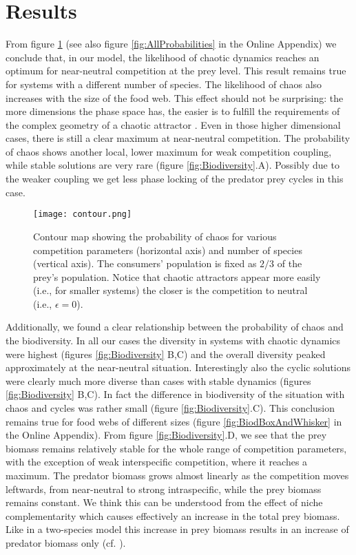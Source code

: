 \section{Results}
\label{sec:Results}
From figure \ref{fig:Contour} (see also figure \ref{fig:AllProbabilities} in the Online Appendix) we conclude that, in our model, the likelihood of chaotic dynamics reaches an optimum for near-neutral competition at the prey level. This result remains true for systems with a different number of species. The likelihood of chaos also increases with the size of the food web. This effect should not be surprising: the more dimensions the phase space has, the easier is to fulfill the requirements of the complex geometry of a chaotic attractor \citep{Strogatz1994}. Even in those higher dimensional cases, there is still a clear maximum at near-neutral competition. The probability of chaos shows another local, lower maximum for weak competition coupling, while stable solutions are very rare (figure \ref{fig:Biodiversity}.A). Possibly due to the weaker coupling we get less phase locking of the predator prey cycles in this case.

\begin{figure}
	\begin{center}
		\texttt{[image: contour.png]}
	\end{center}
	\caption{Contour map showing the probability of chaos for various competition parameters (horizontal axis) and number of species (vertical axis). The consumers' population is fixed as $ 2/3 $ of the prey's population. Notice that chaotic attractors appear more easily (i.e., for smaller systems) the closer is the competition to neutral (i.e., $ \epsilon = 0 $).}
	\label{fig:Contour}
\end{figure}

Additionally, we found a clear relationship between the probability of chaos and the biodiversity. In all our cases the diversity in systems with chaotic dynamics were highest (figures \ref{fig:Biodiversity} B,C) and the overall diversity peaked approximately at the near-neutral situation. Interestingly also the cyclic solutions were clearly much more diverse than cases with stable dynamics (figures \ref{fig:Biodiversity} B,C). In fact the difference in biodiversity of the situation with chaos and cycles was rather small (figure \ref{fig:Biodiversity}.C). This conclusion remains true for food webs of different sizes (figure \ref{fig:BiodBoxAndWhisker} in the Online Appendix). From figure \ref{fig:Biodiversity}.D, we see that the prey biomass remains relatively stable for the whole range of competition parameters, with the exception of weak interspecific competition, where it reaches a maximum. The predator biomass grows almost linearly as the competition moves leftwards, from near-neutral to strong intraspecific, while the prey biomass remains constant. We think this can be understood from the effect of niche complementarity which causes effectively an increase in the total prey biomass. Like in a two-species model this increase in prey biomass results in an increase of predator biomass only (cf. \citet{Rosenzweig1963}).

